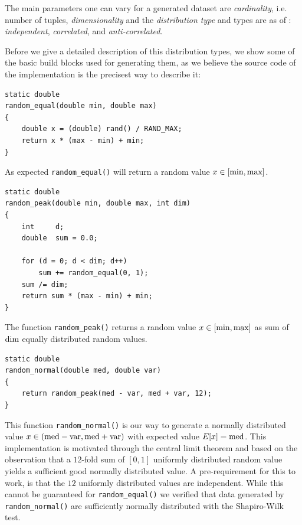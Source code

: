 The main parameters one can vary for a generated dataset are
\emph{cardinality}, i.e. number of tuples, \emph{dimensionality} and
the \emph{distribution type} and types are as of \citep{Borzsonyi2001}: 
\emph{independent}, \emph{correlated}, and \emph{anti-correlated}.


Before we give a detailed description of this distribution types, we
show some of the basic build blocks used for generating them, as we
believe the source code of the implementation is the precisest way to
describe it:

\begin{lstlisting}
static double
random_equal(double min, double max)
{
	double x = (double) rand() / RAND_MAX;
	return x * (max - min) + min;
}
\end{lstlisting}

As expected \lstinline{random_equal()} will return a random value $x
\in [\textnormal{min}, \textnormal{max}]$.

\begin{lstlisting}
static double
random_peak(double min, double max, int dim)
{
	int		d;
	double	sum = 0.0;

	for (d = 0; d < dim; d++)
		sum += random_equal(0, 1);
	sum /= dim;
	return sum * (max - min) + min;
}
\end{lstlisting}

The function \lstinline{random_peak()} returns a random value $x \in
[\textnormal{min}, \textnormal{max}]$ as sum of $\textnormal{dim}$
equally distributed random values.

\begin{lstlisting}
static double
random_normal(double med, double var)
{
	return random_peak(med - var, med + var, 12);
}
\end{lstlisting}

This function \lstinline{random_normal()} is our way to generate a
normally distributed value $x \in (\textnormal{med} -
\textnormal{var}, \textnormal{med} + \textnormal{var})$ with expected
value $E[x] = \textnormal{med}$.
%
This implementation is motivated through the central limit theorem and
based on the observation that a $12$-fold sum of $[0,1]$ uniformly
distributed random value yields a sufficient good normally distributed
value. A pre-requirement for this to work, is that the $12$ uniformly
distributed values are independent. While this cannot be guaranteed
for \lstinline{random_equal()} we verified that data generated by
\lstinline{random_normal()} are sufficiently normally distributed with
the Shapiro-Wilk test.

